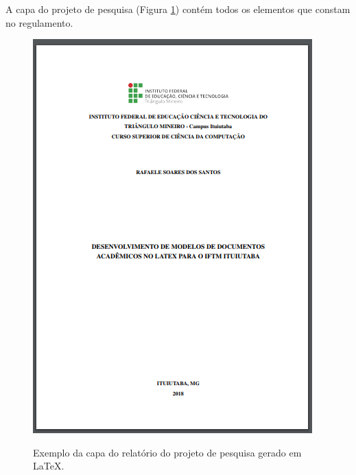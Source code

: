 A capa do projeto de pesquisa (Figura \ref{capaproj}) contém todos os elementos que constam no regulamento.\\
\begin{figure}[h]
	\centering
	\includegraphics{imagens/projetoPesq/Capa.png}\\
	\caption{Exemplo da capa do relatório do projeto de pesquisa gerado em LaTeX.}
	\label{capaproj}
\end{figure}

